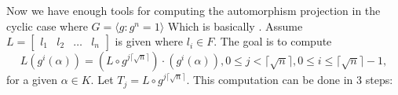 %
% 


Now we have enough tools for computing the automorphism projection in the cyclic case where $G = \langle g: g^n =1 \rangle$
Which is basically \cite[Algorithm AP]{Kaltofen}. 
Assume $L = \begin{bmatrix}
l_1 & l_2 & \ldots & l_n
\end{bmatrix}$ is given where $l_i \in F$. The goal is to compute 
\begin{equation}\label{eq:autproj}
L(g^i(\alpha)) = (L \circ g^{j \lceil \sqrt{n} \rceil})\cdot (g^i(\alpha)), 0 \leq j < \lceil \sqrt{n} \rceil, 0 \leq i \leq \lceil \sqrt{n} \rceil -1, 
\end{equation}
for a given $\alpha \in K$. 
Let $T_j = L\circ g^{j \lceil \sqrt{n} \rceil}$.
This computation can be done in 3 steps:

